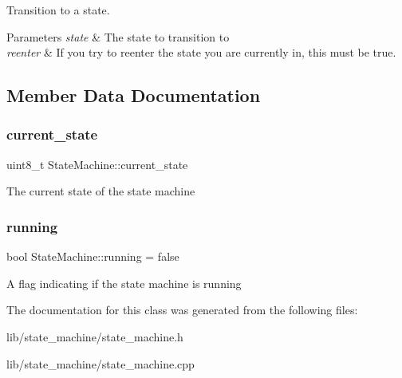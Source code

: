 Transition to a state. 
\begin{DoxyParams}{Parameters}
{\em state} & The state to transition to \\
\hline
{\em reenter} & If you try to reenter the state you are currently in, this must be true. \\
\hline
\end{DoxyParams}


\subsection{Member Data Documentation}
\hypertarget{class_state_machine_abdcd9426d9a2ec9e2d703c74cd3299df}{}\label{class_state_machine_abdcd9426d9a2ec9e2d703c74cd3299df} 
\subsubsection{\texorpdfstring{current\+\_\+state}{current\_state}}
{\footnotesize\ttfamily uint8\+\_\+t State\+Machine\+::current\+\_\+state}

The current state of the state machine \hypertarget{class_state_machine_adc6939485a12a6250df3cc65aa172d2a}{}\label{class_state_machine_adc6939485a12a6250df3cc65aa172d2a} 
\subsubsection{\texorpdfstring{running}{running}}
{\footnotesize\ttfamily bool State\+Machine\+::running = false\hspace{0.3cm}{\ttfamily [private]}}

A flag indicating if the state machine is running 

The documentation for this class was generated from the following files\+:\begin{DoxyCompactItemize}
\item 
lib/state\+\_\+machine/state\+\_\+machine.\+h\item 
lib/state\+\_\+machine/state\+\_\+machine.\+cpp\end{DoxyCompactItemize}
